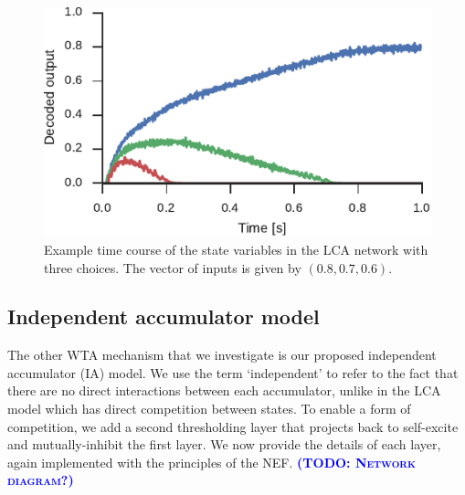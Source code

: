 \documentclass[10pt,letterpaper]{article}
\makeatletter
\newcommand{\todo}[1]{\textbf{\textsc{\textcolor{blue}{(TODO\@: #1)}}}}
\makeatother
\begin{document}
\begin{figure}
    \centering
    \includegraphics{figures/usher-mcclelland}
    \caption{
        Example time course of the state variables in the LCA network with three choices.
        The vector of inputs is given by $(0.8, 0.7, 0.6)$.
    }\label{fig:usher-mcclelland}
\end{figure}

\subsection{Independent accumulator model}
The other WTA mechanism that we investigate is our proposed independent accumulator (IA) model.
We use the term `independent' to refer to the fact that there are no direct interactions between each accumulator, unlike in the LCA model which has direct competition between states.
To enable a form of competition, we add a second thresholding layer that  projects back to self-excite and mutually-inhibit the first layer.
We now provide the details of each layer, again implemented with the principles of the NEF.
\todo{Network diagram?}
\end{document}
